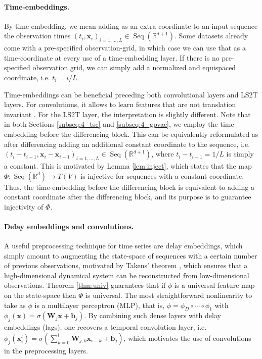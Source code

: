 \documentclass{article} \usepackage{iclr2021_conference,times}
\newcommand{\R}{\mathbb{R}}
\newcommand{\bx}{\mathbf{x}}
\newcommand{\Seq}[1]{\operatorname{Seq}(#1)}
\theoremstyle{plain}
\theoremstyle{definition}
\begin{document}
\paragraph{Time-embeddings.} By time-embedding, we mean adding as an extra coordinate to an input sequence the observation times $(t_i, \bx_i)_{i=1, \dots, L} \in \Seq{\R^{d+1}}$. Some datasets already come with a pre-specified observation-grid, in which case we can use that as a time-coordinate at every use of a time-embedding layer. If there is no pre-specified observation grid, we can simply add a normalized and equispaced coordinate, i.e. $t_i = i / L$.

Time-embeddings can be beneficial preceding both convolutional layers and LS2T layers. For convolutions, it allows to learn features that are not translation invariant \citep{Liu2018coordConv}. For the LS2T layer, the interpretation is slightly different. Note that in both Sections \ref{subseq:4_tsc} and \ref{subseq:4_gpvae}, we employ the time-embedding before the differencing block. This can be equivalently reformulated as after differencing adding an additional constant coordinate to the sequence, i.e. $(t_i - t_{i-1}, \bx_i - \bx_{i-1})_{i=1,\dots,L} \in \Seq{\R^{d+1}}$, where $t_i - t_{i-1} = 1 / L$ is simply a constant. This is motivated by Lemma \ref{lem:inject}, which states that the map $\Phi: \Seq{\R^d} \rightarrow T(V)$ is injective for sequences with a constant coordinate. Thus, the time-embedding before the differencing block is equivalent to adding a constant coordinate after the differencing block, and its purpose is to guarantee injectivity of $\Phi$.

\paragraph{Delay embeddings and convolutions.} A useful preprocessing technique for time series are delay embeddings, which simply amount to augmenting the state-space of sequences with a certain number of previous observations, motivated by Takens' theorem \citep{takens1981detecting,sauer1991embedology}, which ensures that a high-dimensional dynamical system can be reconstructed from low-dimensional observations. Theorem \ref{thm:univ} guarantees  that  if $\phi$ is  a  universal  feature  map  on  the  state-space  then $\Phi$ is universal. The most straightforward nonlinearity to take as $\phi$ is a multilayer perceptron (MLP), that is, $\phi = \phi_D \circ \cdots \circ \phi_1$ with $\phi_{j}(\bx) = \sigma(\mathbf{W}_j \bx + \mathbf{b}_j)$. By combining such dense layers with delay embeddings (lags), one recovers a temporal convolution layer, i.e. $\phi_j(\bx_i^l) = \sigma\left(\sum_{k=0}^l \mathbf{W}_{j,k} \mathbf{x}_{i-k} + \mathbf{b}_j\right)$, which motivates the use of convolutions in the preprocessing layers.
\end{document}
